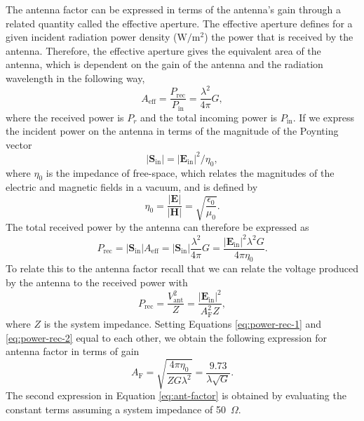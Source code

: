 The antenna factor can be expressed in terms of the antenna's gain through a related quantity called the effective aperture. The effective aperture defines for a given incident radiation power density ($\mathrm{W}/\mathrm{m}^2$) the power that is received by the antenna. Therefore, the effective aperture gives the equivalent area of the antenna, which is dependent on the gain of the antenna and the radiation wavelength in the following way,
\begin{equation}
    A_\mathrm{eff}=\frac{P_\mathrm{rec}}{P_\mathrm{in}}=\frac{\lambda^2}{4\pi}G,
\end{equation}
where the received power is $P_r$ and the total incoming power is $P_\mathrm{in}$. If we express the incident power on the antenna in terms of the magnitude of the Poynting vector
\begin{equation}
    |\mathbf{S}_\mathrm{in}|=|\mathbf{E}_\mathrm{in}|^2/\eta_0,
\end{equation}
where $\eta_0$ is the impedance of free-space, which relates the magnitudes of the electric and magnetic fields in a vacuum, and is defined by
\begin{equation}
    \eta_0 = \frac{|\mathbf{E}|}{|\mathbf{H}|} = \sqrt{\frac{\epsilon_0}{\mu_0}}.
\end{equation}
The total received power by the antenna can therefore be expressed as
\begin{equation}
    P_\mathrm{rec}=|\mathbf{S}_\mathrm{in}|A_\mathrm{eff}=|\mathbf{S}_\mathrm{in}|\frac{\lambda^2}{4\pi}G=\frac{|\mathbf{E}_\mathrm{in}|^2\lambda^2G}{4\pi\eta_0}.
    \label{eq:power-rec-1}
\end{equation}
To relate this to the antenna factor recall that we can relate the voltage produced by the antenna to the received power with
\begin{equation}
    P_\mathrm{rec}=\frac{V_\mathrm{ant}^2}{Z}=\frac{|\mathbf{E}_\mathrm{in}|^2}{A_\mathrm{F}^2Z},
    \label{eq:power-rec-2}
\end{equation}
where $Z$ is the system impedance. Setting Equations \ref{eq:power-rec-1} and \ref{eq:power-rec-2} equal to each other, we obtain the following expression for antenna factor in terms of gain
\begin{equation}
    A_\mathrm{F} = \sqrt{\frac{4\pi\eta_0}{ZG\lambda^2}}=\frac{9.73}{\lambda\sqrt{G}}.
    \label{eq:ant-factor}
\end{equation}
The second expression in Equation \ref{eq:ant-factor} is obtained by evaluating the constant terms assuming a system impedance of 50~$\Omega$.

